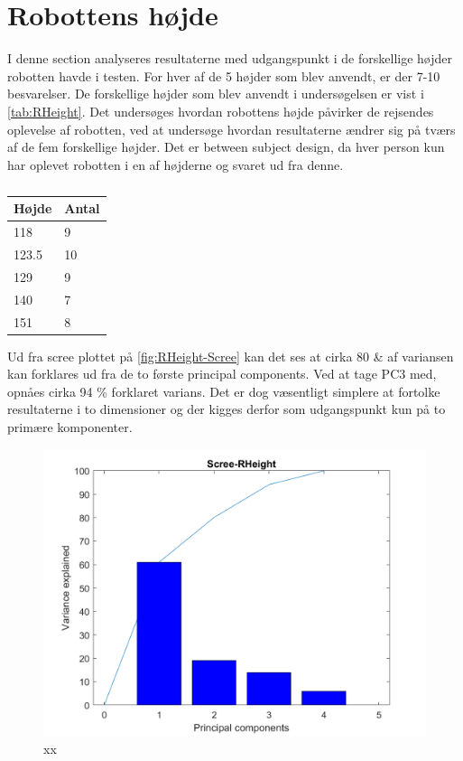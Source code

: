 \section{Robottens højde}
\label{sec:RHeight}
%

I denne section analyseres resultaterne med udgangspunkt i de forskellige højder robotten havde i testen. For hver af de 5 højder som blev anvendt, er der 7-10 besvarelser. De forskellige højder som blev anvendt i undersøgelsen er vist i \autoref{tab:RHeight}. Det undersøges hvordan robottens højde påvirker de rejsendes oplevelse af robotten, ved at undersøge hvordan resultaterne ændrer sig på tværs af de fem forskellige højder. Det er between subject design, da hver person kun har oplevet robotten i en af højderne og svaret ud fra denne.


\begin{table}[H]
\centering
\begin{tabular}{|l|l|}
\hline
Højde & Antal \\ \hline
118   & 9     \\ \hline
123.5 & 10    \\ \hline
129   & 9     \\ \hline
140   & 7     \\ \hline
151   & 8     \\ \hline
\end{tabular}
\caption{}
\label{tab:RHeight}
\end{table}

Ud fra scree plottet på \autoref{fig:RHeight-Scree} kan det ses at cirka 80 \& af variansen kan forklares ud fra de to første principal components. Ved at tage PC3 med, opnåes cirka 94 \% forklaret varians. Det er dog væsentligt simplere at fortolke resultaterne i to dimensioner og der kigges derfor som udgangspunkt kun på to primære komponenter.



\begin{figure}[H]
\centering
\includegraphics[width=\textwidth]{Figure/DatabehandlingSkalaer/PCAfigures/RHeight-Scree.png}
\caption{xx}
\label{fig:RHeight-Scree}
\end{figure}


